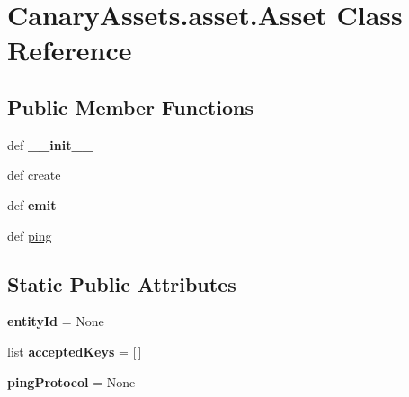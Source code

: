 \hypertarget{class_canary_assets_1_1asset_1_1_asset}{\section{Canary\-Assets.\-asset.\-Asset Class Reference}
\label{class_canary_assets_1_1asset_1_1_asset}
}
\subsection*{Public Member Functions}
\begin{DoxyCompactItemize}
\item 
\hypertarget{class_canary_assets_1_1asset_1_1_asset_a18ee9621fa78a1ff950e18cd8b19cf30}{def {\bfseries \-\_\-\-\_\-init\-\_\-\-\_\-}}\label{class_canary_assets_1_1asset_1_1_asset_a18ee9621fa78a1ff950e18cd8b19cf30}

\item 
def \hyperlink{class_canary_assets_1_1asset_1_1_asset_a6da06ae50025d4c725deda140631fb42}{create}
\item 
\hypertarget{class_canary_assets_1_1asset_1_1_asset_a583d6b697ead4165c0aa5cd725f8b9d3}{def {\bfseries emit}}\label{class_canary_assets_1_1asset_1_1_asset_a583d6b697ead4165c0aa5cd725f8b9d3}

\item 
def \hyperlink{class_canary_assets_1_1asset_1_1_asset_a1c85f666b448bb95561836321d65e7bc}{ping}
\end{DoxyCompactItemize}
\subsection*{Static Public Attributes}
\begin{DoxyCompactItemize}
\item 
\hypertarget{class_canary_assets_1_1asset_1_1_asset_aac567b73a7223bebedaf84c536d59192}{{\bfseries entity\-Id} = None}\label{class_canary_assets_1_1asset_1_1_asset_aac567b73a7223bebedaf84c536d59192}

\item 
\hypertarget{class_canary_assets_1_1asset_1_1_asset_a465f254e8bc7bdc624a38d214a718d54}{list {\bfseries accepted\-Keys} = \mbox{[}$\,$\mbox{]}}\label{class_canary_assets_1_1asset_1_1_asset_a465f254e8bc7bdc624a38d214a718d54}

\item 
\hypertarget{class_canary_assets_1_1asset_1_1_asset_a751c6c3677480827c6f96869e13888d1}{{\bfseries ping\-Protocol} = None}\label{class_canary_assets_1_1asset_1_1_asset_a751c6c3677480827c6f96869e13888d1}

\end{DoxyCompactItemize}


